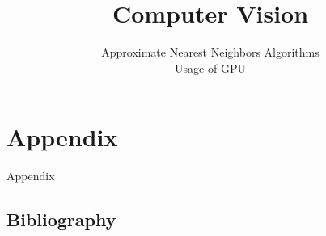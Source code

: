 
\title{Computer Vision}
\subtitle{Approximate Nearest Neighbors Algorithms \\ Usage of GPU}




	
	

%	

%	
	
	
	
	
	
	\section*{Appendix}
	\begin{frame}
		\Huge
		Appendix
	\end{frame}
%	
	\subsection*{Bibliography}
		
	
		
